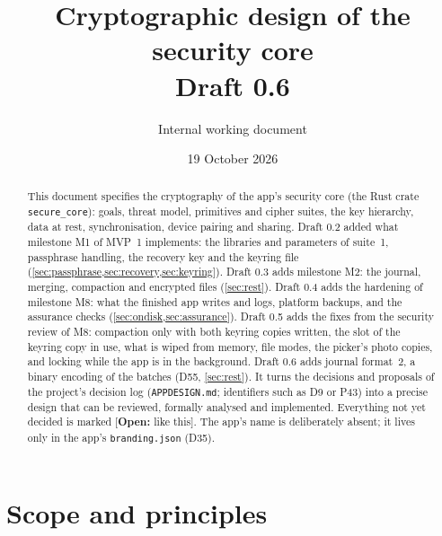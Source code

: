 \documentclass[11pt,a4paper]{article}
\title{Cryptographic design of the security core\\[2pt]\large Draft 0.6}
\author{Internal working document}
\date{19 October 2026}
\newcommand{\todo}[1]{\textcolor{red!70!black}{[\textbf{Open:} #1]}}
\newcommand{\dref}[1]{\textsf{#1}} %
\begin{document}
\maketitle

\begin{abstract}
This document specifies the cryptography of the app's security core (the Rust crate \texttt{secure\_core}): goals, threat model, primitives and cipher suites, the key hierarchy, data at rest, synchronisation, device pairing and sharing. Draft 0.2 added what milestone M1 of MVP~1 implements: the libraries and parameters of suite~1, passphrase handling, the recovery key and the keyring file (\cref{sec:passphrase,sec:recovery,sec:keyring}). Draft 0.3 adds milestone M2: the journal, merging, compaction and encrypted files (\cref{sec:rest}). Draft 0.4 adds the hardening of milestone M8: what the finished app writes and logs, platform backups, and the assurance checks (\cref{sec:ondisk,sec:assurance}). Draft 0.5 adds the fixes from the security review of M8: compaction only with both keyring copies written, the slot of the keyring copy in use, what is wiped from memory, file modes, the picker's photo copies, and locking while the app is in the background. Draft 0.6 adds journal format~2, a binary encoding of the batches (\dref{D55}, \cref{sec:rest}). It turns the decisions and proposals of the project's decision log (\texttt{APPDESIGN.md}; identifiers such as \dref{D9} or \dref{P43}) into a precise design that can be reviewed, formally analysed and implemented. Everything not yet decided is marked \todo{like this}. The app's name is deliberately absent; it lives only in the app's \texttt{branding.json} (\dref{D35}).
\end{abstract}

\tableofcontents

\section{Scope and principles}
\end{document}
